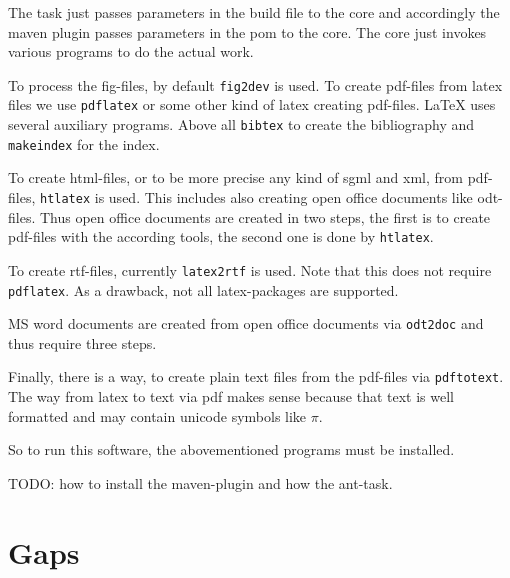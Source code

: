 \documentclass[12pt]{article}
\begin{document}
The task just passes parameters in the build file to the core 
and accordingly the maven plugin passes parameters in the pom 
to the core. 
The core just invokes various programs to do the actual work. 

To process the fig-files, by default {\tt fig2dev} is used. 
To create pdf-files from latex files we use {\tt pdflatex} 
or some other kind of latex creating pdf-files. 
LaTeX uses several auxiliary programs. 
Above all {\tt bibtex} to create the bibliography 
and {\tt makeindex} for the index. 

To create html-files, or to be more precise any kind of sgml and xml, 
from pdf-files, {\tt htlatex} is used. 
This includes also creating open office documents like odt-files. 
Thus open office documents are created in two steps, 
the first is to create pdf-files with the according tools, 
the second one is done by {\tt htlatex}. 

To create rtf-files, currently {\tt latex2rtf} is used. 
Note that this does not require {\tt pdflatex}. 
As a drawback, not all latex-packages are supported. 

MS word documents are created from open office documents via {\tt odt2doc} 
and thus require three steps. 

Finally, there is a way, to create plain text files from the pdf-files 
via {\tt pdftotext}. 
The way from latex to text via pdf makes sense 
because that text is well formatted 
and may contain unicode symbols like $\pi$. 

So to run this software, the abovementioned programs must be installed. 

TODO: how to install the maven-plugin and how the ant-task. 

\section{Gaps}
\end{document}
